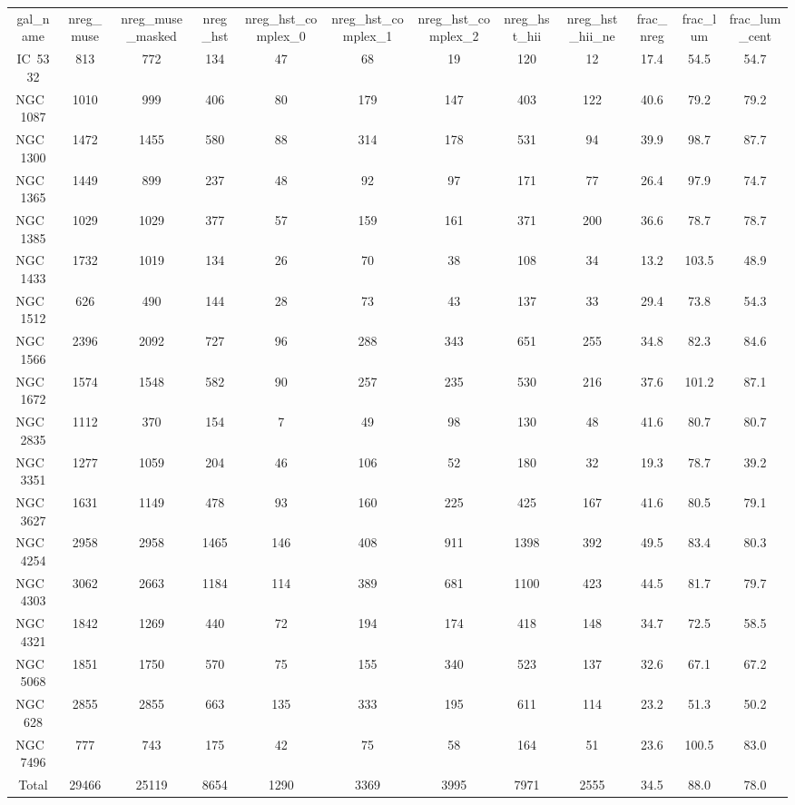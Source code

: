 \begin{table}
\begin{tabular}{cccccccccccc}
gal_name & nreg_muse & nreg_muse_masked & nreg_hst & nreg_hst_complex_0 & nreg_hst_complex_1 & nreg_hst_complex_2 & nreg_hst_hii & nreg_hst_hii_ne & frac_nreg & frac_lum & frac_lum_cent \\
IC~5332 & 813 & 772 & 134 & 47 & 68 & 19 & 120 & 12 & 17.4 & 54.5 & 54.7 \\
NGC~1087 & 1010 & 999 & 406 & 80 & 179 & 147 & 403 & 122 & 40.6 & 79.2 & 79.2 \\
NGC~1300 & 1472 & 1455 & 580 & 88 & 314 & 178 & 531 & 94 & 39.9 & 98.7 & 87.7 \\
NGC~1365 & 1449 & 899 & 237 & 48 & 92 & 97 & 171 & 77 & 26.4 & 97.9 & 74.7 \\
NGC~1385 & 1029 & 1029 & 377 & 57 & 159 & 161 & 371 & 200 & 36.6 & 78.7 & 78.7 \\
NGC~1433 & 1732 & 1019 & 134 & 26 & 70 & 38 & 108 & 34 & 13.2 & 103.5 & 48.9 \\
NGC~1512 & 626 & 490 & 144 & 28 & 73 & 43 & 137 & 33 & 29.4 & 73.8 & 54.3 \\
NGC~1566 & 2396 & 2092 & 727 & 96 & 288 & 343 & 651 & 255 & 34.8 & 82.3 & 84.6 \\
NGC~1672 & 1574 & 1548 & 582 & 90 & 257 & 235 & 530 & 216 & 37.6 & 101.2 & 87.1 \\
NGC~2835 & 1112 & 370 & 154 & 7 & 49 & 98 & 130 & 48 & 41.6 & 80.7 & 80.7 \\
NGC~3351 & 1277 & 1059 & 204 & 46 & 106 & 52 & 180 & 32 & 19.3 & 78.7 & 39.2 \\
NGC~3627 & 1631 & 1149 & 478 & 93 & 160 & 225 & 425 & 167 & 41.6 & 80.5 & 79.1 \\
NGC~4254 & 2958 & 2958 & 1465 & 146 & 408 & 911 & 1398 & 392 & 49.5 & 83.4 & 80.3 \\
NGC~4303 & 3062 & 2663 & 1184 & 114 & 389 & 681 & 1100 & 423 & 44.5 & 81.7 & 79.7 \\
NGC~4321 & 1842 & 1269 & 440 & 72 & 194 & 174 & 418 & 148 & 34.7 & 72.5 & 58.5 \\
NGC~5068 & 1851 & 1750 & 570 & 75 & 155 & 340 & 523 & 137 & 32.6 & 67.1 & 67.2 \\
NGC~628 & 2855 & 2855 & 663 & 135 & 333 & 195 & 611 & 114 & 23.2 & 51.3 & 50.2 \\
NGC~7496 & 777 & 743 & 175 & 42 & 75 & 58 & 164 & 51 & 23.6 & 100.5 & 83.0 \\
Total & 29466 & 25119 & 8654 & 1290 & 3369 & 3995 & 7971 & 2555 & 34.5 & 88.0 & 78.0 \\
\end{tabular}
\end{table}
